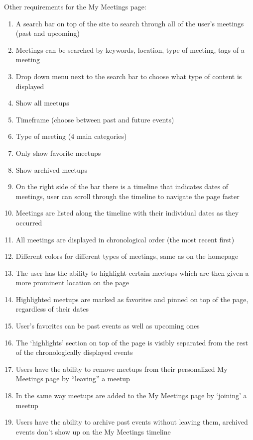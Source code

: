 \documentclass[conference]{IEEEtran}
\begin{document}
Other requirements for the My Meetings page:

\begin{enumerate}
\item A search bar on top of the site to search through all of the
user’s meetings (past and upcoming)
\item Meetings can be searched by keywords, location, type of
meeting, tags of a meeting
\item Drop down menu next to the search bar to choose what
type of content is displayed
\item Show all meetups
\item Timeframe (choose between past and future
events)
\item Type of meeting (4 main categories)
\item Only show favorite meetups
\item Show archived meetups
\item On the right side of the bar there is a timeline that indicates dates of meetings, user can scroll through the timeline to navigate the page faster
\item Meetings are listed along the timeline with their individual dates as they occurred
\item All meetings are displayed in chronological order (the most recent first)
\item Different colors for different types of meetings, same as on the homepage
\item The user has the ability to highlight certain meetups which are then given a more prominent location on the page
\item Highlighted meetups are marked as favorites and pinned on top of the page, regardless of their dates
\item User’s favorites can be past events as well as upcoming ones
\item The ‘highlights’ section on top of the page is visibly separated from the rest of the chronologically displayed events
\item Users have the ability to remove meetups from their personalized My Meetings page by “leaving” a meetup
\item In the same way meetups are added to the My Meetings page by ‘joining’ a meetup
\item Users have the ability to archive past events without leaving them, archived events don’t show up on the My Meetings timeline
\end{enumerate}
\end{document}
